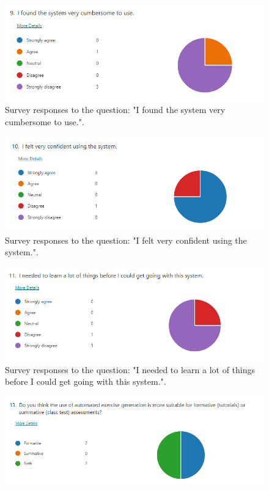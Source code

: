 \documentclass{l4proj}
\begin{document}
\begin{appendices}
\begin{figure}[h]
    \centering
    \includegraphics[width=0.9\linewidth]{images/usability8.png}    

    \caption{Survey responses to the question: "I found the system very cumbersome to use.".}
    \label{fig:usability8} 
\end{figure}

\begin{figure}[h]
    \centering
    \includegraphics[width=0.9\linewidth]{images/usability9.png}    

    \caption{Survey responses to the question: "I felt very confident using the system.".}
    \label{fig:usability9} 
\end{figure}

\begin{figure}[h]
    \centering
    \includegraphics[width=0.9\linewidth]{images/usability10.png}    

    \caption{Survey responses to the question: "I needed to learn a lot of things before I could get going with this system.".}
    \label{fig:usability10} 
\end{figure}

\begin{figure}[h]
    \centering
    \includegraphics[width=0.9\linewidth]{images/t_summative_formative.png}    


\end{figure}
\end{appendices}
\end{document}
